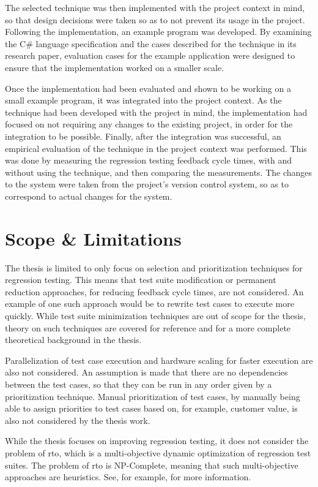 \documentclass[a4paper,english,12pt]{report}
\begin{document}
The selected technique was then implemented with the project context in mind, so that design decisions were taken so as to not prevent its usage in the project. Following the implementation, an example program was developed. By examining the C\# language specification and the cases described for the technique in its research paper, evaluation cases for the example application were designed to ensure that the implementation worked on a smaller scale.

Once the implementation had been evaluated and shown to be working on a small example program, it was integrated into the project context. As the technique had been developed with the project in mind, the implementation had focused on not requiring any changes to the existing project, in order for the integration to be possible. Finally, after the integration was successful, an empirical evaluation of the technique in the project context was performed. This was done by measuring the regression testing feedback cycle times, with and without using the technique, and then comparing the measurements. The changes to the system were taken from the project's version control system, so as to correspond to actual changes for the system.

\section{Scope \& Limitations}
The thesis is limited to only focus on selection and prioritization techniques for regression testing. This means that test suite modification or permanent reduction approaches, for reducing feedback cycle times, are not considered. An example of one such approach would be to rewrite test cases to execute more quickly. While test suite minimization techniques are out of scope for the thesis, theory on such techniques are covered for reference and for a more complete theoretical background in the thesis.

Parallelization of test case execution and hardware scaling for faster execution are also not considered. An assumption is made that there are no dependencies between the test cases, so that they can be run in any order given by a prioritization technique. Manual prioritization of test cases, by manually being able to assign priorities to test cases based on, for example, customer value, is also not considered by the thesis work.

While the thesis focuses on improving regression testing, it does not consider the problem of \gls{rto}, which is a multi-objective dynamic optimization of regression test suites. The problem of \gls{rto} is NP-Complete, meaning that such multi-objective approaches are heuristics. See, for example, \citet{anwar2014exploration} for more information.
\end{document}
